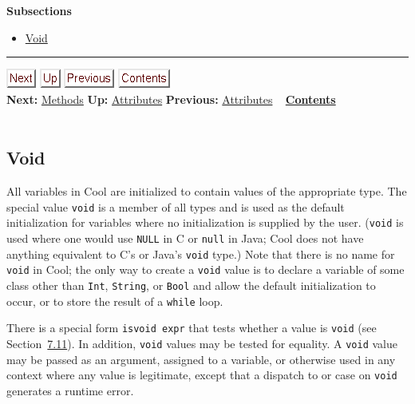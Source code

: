 \documentclass[]{article}
\begin{document}
\textbf{Subsections}

\begin{itemize}
\itemsep1pt\parskip0pt
\item
  \href{node11.html}{Void}
\end{itemize}

\begin{center}\rule{3in}{0.4pt}\end{center}

\href{node12.html}{\includegraphics{next.png}}
\href{node10.html}{\includegraphics{up.png}}
\href{node10.html}{\includegraphics{prev.png}}
\href{node1.html}{\includegraphics{contents.png}} \\ \textbf{Next:}
\href{node12.html}{Methods} \textbf{Up:} \href{node10.html}{Attributes}
\textbf{Previous:} \href{node10.html}{Attributes} ~
\textbf{\href{node1.html}{Contents}} \\ \\

\subsection{Void}

All variables in Cool are initialized to contain values of the
appropriate type. The special value \texttt{void} is a member of all
types and is used as the default initialization for variables where no
initialization is supplied by the user. (\texttt{void} is used where one
would use \texttt{NULL} in C or \texttt{null} in Java; Cool does not
have anything equivalent to C's or Java's \texttt{void} type.) Note that
there is no name for \texttt{void} in Cool; the only way to create a
\texttt{void} value is to declare a variable of some class other than
\texttt{Int}, \texttt{String}, or \texttt{Bool} and allow the default
initialization to occur, or to store the result of a \texttt{while}
loop.

There is a special form \texttt{isvoid expr} that tests whether a value
is \texttt{void} (see Section~\href{node24.html\#sec-isvoid}{7.11}). In
addition, \texttt{void} values may be tested for equality. A
\texttt{void} value may be passed as an argument, assigned to a
variable, or otherwise used in any context where any value is
legitimate, except that a dispatch to or case on \texttt{void} generates
a runtime error.
\end{document}
